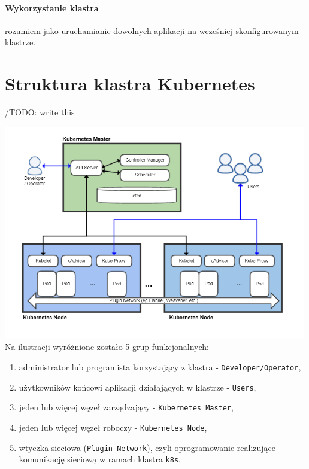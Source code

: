 \documentclass[a4paper,12pt,twoside,openany]{report}
\providecommand{\tightlist}{%
  \setlength{\itemsep}{0pt}\setlength{\parskip}{0pt}}
\newcommand{\passthrough}[1]{#1}
\begin{document}
\hypertarget{wykorzystanie-klastra}{%
\paragraph{Wykorzystanie klastra}\label{wykorzystanie-klastra}}

rozumiem jako uruchamianie dowolnych aplikacji na wcześniej
skonfigurowanym klastrze.

\hypertarget{struktura-klastra-kubernetes}{%
\section{Struktura klastra
Kubernetes}\label{struktura-klastra-kubernetes}}

/TODO: write this

\includegraphics[width=5.20833in,height=3.6875in]{assets/kubernetes-architecture.png}\\

Na ilustracji wyróżnione zostało 5 grup funkcjonalnych:

\begin{enumerate}
\def\labelenumi{\arabic{enumi}.}
\tightlist
\item
  administrator lub programista korzystający z klastra -
  \passthrough{\lstinline!Developer/Operator!},
\item
  użytkowników końcowi aplikacji działających w klastrze -
  \passthrough{\lstinline!Users!},
\item
  jeden lub więcej węzeł zarządzający -
  \passthrough{\lstinline!Kubernetes Master!},
\item
  jeden lub więcej węzeł roboczy -
  \passthrough{\lstinline!Kubernetes Node!},
\item
  wtyczka sieciowa (\passthrough{\lstinline!Plugin Network!}), czyli
  oprogramowanie realizujące komunikację sieciową w ramach klastra
  \passthrough{\lstinline!k8s!},
\end{enumerate}
\end{document}
